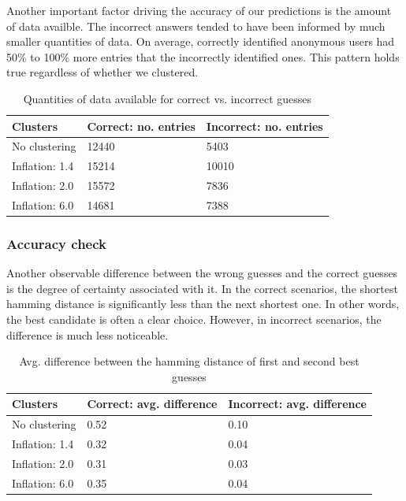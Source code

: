\documentclass[pageno]{jpaper}
\begin{document}
Another important factor driving the accuracy of our predictions is the amount of data availble. The incorrect answers tended to have been informed by much smaller quantities of data. On average, correctly identified anonymous users had 50\% to 100\% more entries that the incorrectly identified ones. This pattern holds true regardless of whether we clustered.

\begin{table}[h!]
  \centering
  \begin{tabular}{|l|l|l|}
    \hline
    \textbf{Clusters} & \textbf{Correct: no. entries} & \textbf{Incorrect: no. entries}\\
    \hline
    \hline
    No clustering & 12440 & 5403\\
    \hline
    Inflation: 1.4 & 15214 & 10010\\
    \hline
    Inflation: 2.0 &  15572 & 7836\\
    \hline
    Inflation: 6.0 & 14681 & 7388\\
    \hline
  \end{tabular}
  \caption{Quantities of data available for correct vs. incorrect guesses}
  \label{table:formatting}
\end{table}


\subsubsection{Accuracy check}

Another observable difference between the wrong guesses and the correct guesses is the degree of certainty associated with it. In the correct scenarios, the shortest hamming distance is significantly less than the next shortest one. In other words, the best candidate is often a clear choice. However, in incorrect scenarios, the difference is much less noticeable.

\begin{table}[h!]
  \centering
  \begin{tabular}{|l|l|l|}
    \hline
    \textbf{Clusters} & \textbf{Correct: avg. difference} & \textbf{Incorrect: avg. difference}\\
    \hline
    \hline
    No clustering &  0.52 & 0.10\\
    \hline
    Inflation: 1.4 & 0.32 & 0.04\\
    \hline
    Inflation: 2.0 &  0.31& 0.03\\
    \hline
    Inflation: 6.0 &  0.35 & 0.04 \\
    \hline
  \end{tabular}
  \caption{Avg. difference between the hamming distance of first and second best guesses}
  \label{table:formatting}
\end{table}
\end{document}
